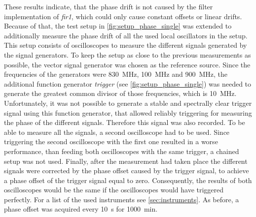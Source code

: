 \documentclass[12pt,a4paper,parskip=full,abstract=true,BCOR=12mm,twoside,open=right]{scrreprt}
\def\device#1{\textit{#1}}
\begin{document}
These results indicate, that the phase drift is not caused by the filter implementation of
\device{fir1}, which could only cause constant offsets or linear drifts. Because of that, the test
setup in \cref{fig:setup_phase_single} was extended to additionally measure the phase drift of all the
used local oscillators in the setup. This setup consists of oscilloscopes to measure
the different signals generated by the signal generators. To keep the setup as close to the previous measurements as possible, the
vector signal generator was chosen as the reference source. Since the frequencies
of the generators were \SI{830}{\mega\hertz}, \SI{100}{\mega\hertz} and \SI{900}{\mega\hertz},
the additional function generator \device{trigger} (see \cref{fig:setup_phase_single}) was needed to
generate the greatest common divisor of those frequencies, which is \SI{10}{\mega\hertz}.
Unfortunately, it was not possible to generate a stable and spectrally clear trigger signal using this function generator, that
allowed reliably triggering for measuring the phase of the different signals. Therefore this signal was also recorded.
To be able to measure all the signals, a second oscilloscope had to be used. Since triggering
the second oscilloscope with the first one resulted in a worse performance, than feeding both
oscilloscopes with the same trigger, a chained setup was not used. Finally, after the measurement had taken place the
different signals were corrected by the phase offset caused by the trigger signal, to achieve a phase
offset of the trigger signal equal to zero. Consequently, the results of both oscilloscopes would be the same if the oscilloscopes would
have triggered perfectly. For a list of the used instruments see \cref{sec:instruments}. As before, a phase offset was acquired every \SI{10}{\second}
for \SI{1000}{\minute}.
\end{document}
